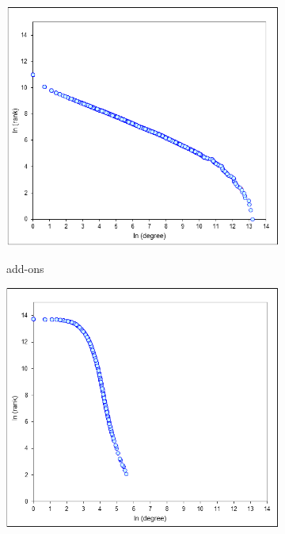 \documentclass[11pt,oneside]{book}
\begin{document}
\begin{figure}[t]
\centering
\begin{subfigure}[b]{0.49\textwidth}
	\centering
\includegraphics[scale=0.49]{figures/zipf_addon.png} \\
\caption{add-ons} 
\end{subfigure}
\begin{subfigure}[b]{0.49\textwidth}
	\centering
\includegraphics[scale=0.49]{figures/zipf-users.png} \\

\end{subfigure}
\end{figure}
\end{document}
